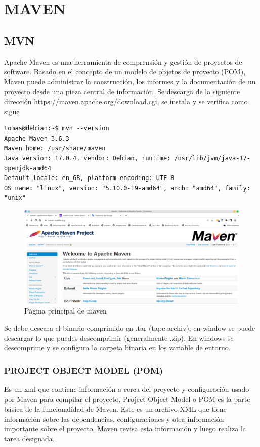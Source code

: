 \chapter{MAVEN}
\section{MVN}
Apache Maven es una herramienta de comprensión y gestión de proyectos de software. Basado en el concepto de un modelo de objetos de proyecto (POM), Maven puede administrar la construcción, los informes y la documentación de un proyecto desde una pieza central de información. Se descarga de la siguiente dirección  \url{https://maven.apache.org/download.cgi}, se instala y se verifica como sigue
\begin{verbatim}
tomas@debian:~$ mvn --version
Apache Maven 3.6.3
Maven home: /usr/share/maven
Java version: 17.0.4, vendor: Debian, runtime: /usr/lib/jvm/java-17-openjdk-amd64
Default locale: en_GB, platform encoding: UTF-8
OS name: "linux", version: "5.10.0-19-amd64", arch: "amd64", family: "unix"
\end{verbatim}
\begin{figure}[h]
\centering
\includegraphics[scale=0.4]{images/maven1}
\caption{Página principal de maven}
\end{figure}
Se debe descara el binario comprimido en .tar (tape archiv); en window se puede descargar lo que puedes descomprimir (generalmente .zip). En windows se descomprime y se configura la carpeta binaria en los variable de entorno. 
\subsection{PROJECT OBJECT MODEL (POM)}
Es un xml  que contiene información a cerca del proyecto y configuración usado por Maven para compilar el proyecto. Project Object Model o POM es la parte básica de la funcionalidad de Maven. Este es un archivo XML que tiene información sobre las dependencias, configuraciones y otra información importante sobre el proyecto. Maven revisa esta información y luego realiza la tarea designada.

